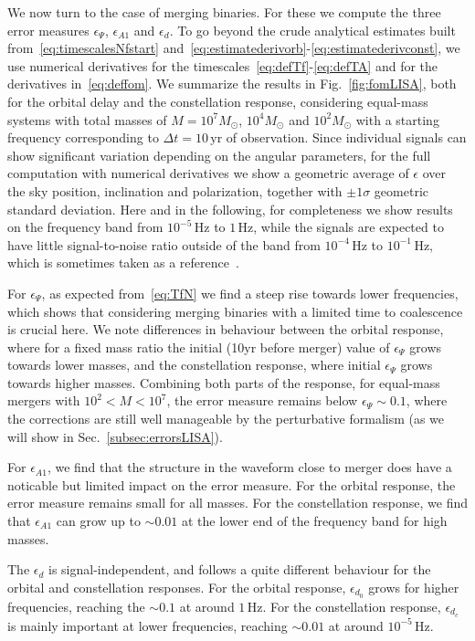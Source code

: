 \documentclass[aps,showpacs,twocolumn,
prd,superscriptaddress,nofootinbib]{revtex4-1}
\newcommand{\Hz}{\,\mathrm{Hz}}
\newcommand{\yr}{\,\mathrm{yr}}
\newcommand{\Msol}{M_{\odot}}
\newcommand{\jgb}[1]{{\color{DarkGreen} #1}}
\begin{document}
We now turn to the case of merging binaries. For these we compute the three error measures $\epsilon_{\Psi}$, $\epsilon_{A1}$ and $\epsilon_{d}$. To go beyond the crude analytical estimates built from~\eqref{eq:timescalesNfstart} and~\eqref{eq:estimatederivorb}-\eqref{eq:estimatederivconst}, we use numerical derivatives for the timescales~\eqref{eq:defTf}-\eqref{eq:defTA} and for the derivatives in~\eqref{eq:deffom}. We summarize the results in Fig.~\ref{fig:fomLISA}, both for the orbital delay and the constellation response, considering equal-mass systems with total masses of $M=10^{7} \Msol$, $10^{4} \Msol$ and $10^{2} \Msol$ with a starting frequency corresponding to $\Delta t =10 \yr$ of observation. Since individual signals can show significant variation depending on the angular parameters, for the full computation with numerical derivatives we show a geometric average of $\epsilon$ over the sky position, inclination and polarization, together with $\pm 1\sigma$ geometric standard deviation. Here and in the following, for completeness we show results on the frequency band from $10^{-5}\Hz$ to $1\Hz$, while the signals are expected to have little signal-to-noise ratio outside of the band from $10^{-4}\Hz$ to $10^{-1}\Hz$, which is sometimes taken as a reference~\cite{LISA17}.

For $\epsilon_{\Psi}$, as expected from~\eqref{eq:TfN} we find a steep rise towards lower frequencies, which shows that considering merging binaries with a limited time to coalescence is crucial here. \jgb{We note differences in} behaviour between the orbital response, where for a fixed mass ratio the initial \jgb{(10yr before merger)} value of $\epsilon_{\Psi}$ grows towards lower masses, and the constellation response, where \jgb{initial} $\epsilon_{\Psi}$ grows towards higher masses. \jgb{Combining both parts of the response, for equal-mass mergers with $10^2<M<10^7$,} the error measure remains below $\epsilon_{\Psi} \sim 0.1$, where the corrections are still well manageable by the perturbative formalism (as we will show in Sec.~\ref{subsec:errorsLISA}).

For $\epsilon_{A1}$, we find that the structure in the waveform close to merger does have a noticable but limited impact on the error measure. For the orbital response, the error measure remains small for all masses. For the constellation response, we find that $\epsilon_{A1}$ can grow up to $\sim 0.01$ at the lower end of the frequency band for high masses.

The $\epsilon_{d}$ is signal-independent, and follows a quite different behaviour for the orbital and constellation responses. For the orbital response, $\epsilon_{d_{0}}$ grows for higher frequencies, reaching the $\sim 0.1$ at around $1\Hz$. For the constellation response, $\epsilon_{d_{c}}$ is mainly important at lower frequencies, reaching $\sim 0.01$ at around $10^{-5}\Hz$.
\end{document}
